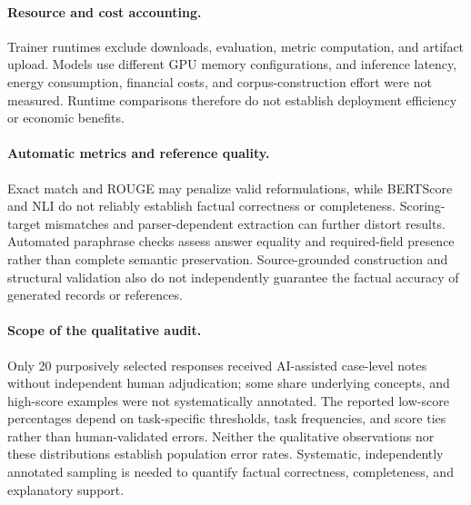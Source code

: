 \documentclass[a4paper,fleqn]{cas-sc}
\begin{document}
\paragraph{Resource and cost accounting.}
Trainer runtimes exclude downloads, evaluation, metric computation, and artifact upload. Models use different GPU memory configurations, and inference latency, energy consumption, financial costs, and corpus-construction effort were not measured. Runtime comparisons therefore do not establish deployment efficiency or economic benefits.

\paragraph{Automatic metrics and reference quality.}
Exact match and ROUGE may penalize valid reformulations, while BERTScore and NLI do not reliably establish factual correctness or completeness. Scoring-target mismatches and parser-dependent extraction can further distort results. Automated paraphrase checks assess answer equality and required-field presence rather than complete semantic preservation. Source-grounded construction and structural validation also do not independently guarantee the factual accuracy of generated records or references.

\paragraph{Scope of the qualitative audit.}
Only 20 purposively selected responses received AI-assisted case-level notes without independent human adjudication; some share underlying concepts, and high-score examples were not systematically annotated. The reported low-score percentages depend on task-specific thresholds, task frequencies, and score ties rather than human-validated errors. Neither the qualitative observations nor these distributions establish population error rates. Systematic, independently annotated sampling is needed to quantify factual correctness, completeness, and explanatory support.



\end{document}
